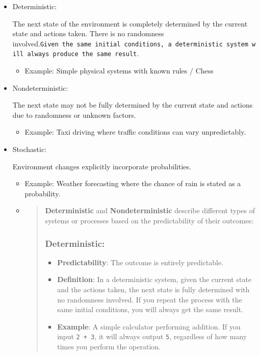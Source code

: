 \documentclass[
]{article}
\begin{document}
\begin{itemize}
\item
  Deterministic:

  The next state of the environment is completely determined by the
  current state and actions taken. There is no randomness
  involved.\texttt{Given\ the\ same\ initial\ conditions,\ a\ deterministic\ system\ will\ always\ produce\ the\ same\ result}.

  \begin{itemize}
  \item
    Example: Simple physical systems with known rules / Chess
  \end{itemize}
\item
  Nondeterministic:

  The next state may not be fully determined by the current state and
  actions due to randomness or unknown factors.

  \begin{itemize}
  \item
    Example: Taxi driving where traffic conditions can vary
    unpredictably.
  \end{itemize}
\item
  Stochastic:

  Environment changes explicitly incorporate probabilities.

  \begin{itemize}
  \item
    Example: Weather forecasting where the chance of rain is stated as a
    probability.
  \item
    \begin{quote}
    \textbf{Deterministic} and \textbf{Nondeterministic} describe
    different types of systems or processes based on the predictability
    of their outcomes:

    \subsubsection{\texorpdfstring{\textbf{Deterministic}:}{Deterministic:}}\label{deterministic}

    \begin{itemize}
    \item
      \textbf{Predictability}: The outcome is entirely predictable.
    \item
      \textbf{Definition}: In a deterministic system, given the current
      state and the actions taken, the next state is fully determined
      with no randomness involved. If you repeat the process with the
      same initial conditions, you will always get the same result.
    \item
      \textbf{Example}: A simple calculator performing addition. If you
      input \texttt{2\ +\ 3}, it will always output \texttt{5},
      regardless of how many times you perform the operation.
    \end{itemize}


\end{quote}
\end{itemize}
\end{itemize}
\end{document}
